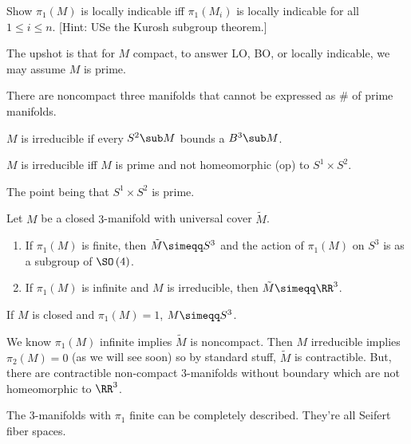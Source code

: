 \begin{exr}
Show $\pi_1\left(M\right)$ is locally indicable iff $\pi_1\left(M_i\right)$ is locally
indicable for all $1\leq i\leq n$.
[Hint: USe the Kurosh subgroup theorem.]
\end{exr}

The upshot is that for $M$ compact, to answer LO, BO, or locally indicable, we may assume $M$ is prime.

\begin{rmk}
There are noncompact three manifolds that cannot be expressed as $\#$ of prime manifolds.
\end{rmk}

$M$ is irreducible if every $S^2\sub M$ bounds a $B^3\sub M$.

\begin{fact}
$M$ is irreducible iff $M$ is prime
and not homeomorphic (op) to $S^1 \times S^2$.
\end{fact}

The point being that $S^1 \times S^2$ is prime.

\begin{thm}
Let $M$ be a closed $3$-manifold with universal cover $\tilde M$. 
\begin{enumerate}
\item If $\pi_1\left(M\right)$ is finite, then $\tilde M\simeqq S^3$ and the action of
$\pi_1\left(M\right)$ on $S^3$ is as a subgroup of $\SO\left(4\right)$.

\item If $\pi_1\left(M\right)$ is infinite and $M$ is irreducible, then $\tilde M\simeqq
\RR^3$.
\end{enumerate}
\end{thm}

\begin{cor}
If $M$ is closed and $\pi_1\left(M\right) = 1$, $M\simeqq S^3$.
\end{cor}

\begin{rmk}
We know $\pi_1\left(M\right)$ infinite implies $\tilde M$ is noncompact. 
Then $M$ irreducible
implies $\pi_2\left(M\right) = 0$ (as we will see soon) so by standard stuff, $\tilde M$
is contractible. 
But, there are contractible non-compact $3$-manifolds without boundary which are not
homeomorphic to $\RR^3$.
\end{rmk}

The $3$-manifolds with $\pi_1$ finite can be completely described. They're all Seifert
fiber spaces.

